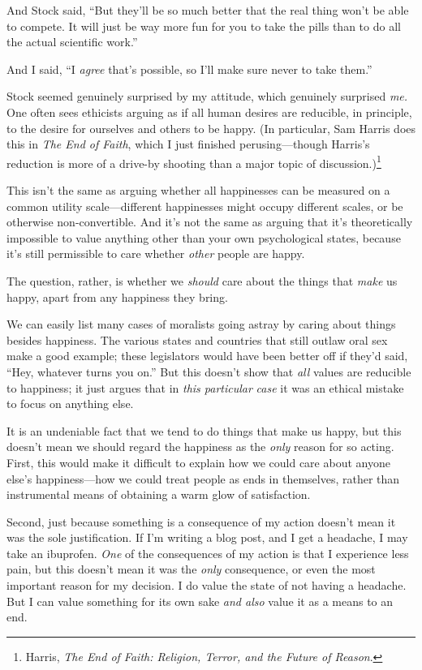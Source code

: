 {
 And Stock said, ``But they'll be
so much better that the real thing won't be able to
compete. It will just be way more fun for you to take the pills than to
do all the actual scientific work.''}

{
 And I said, ``I \textit{agree}
that's possible, so I'll make sure
never to take them.''}

{
 Stock seemed genuinely surprised by my attitude, which genuinely
surprised \textit{me.} One often sees ethicists arguing as if all human
desires are reducible, in principle, to the desire for ourselves and
others to be happy. (In particular, Sam Harris does this in \textit{The
End of Faith}, which I just finished perusing---though
Harris's reduction is more of a drive-by shooting than
a major topic of discussion.)\footnote{Harris, \textit{The End of Faith: Religion, Terror, and the
Future of Reason}.}}

{
 This isn't the same as arguing whether all
happinesses can be measured on a common utility scale---different
happinesses might occupy different scales, or be otherwise
non-convertible. And it's not the same as arguing that
it's theoretically impossible to value anything other
than your own psychological states, because it's still
permissible to care whether \textit{other} people are happy.}

{
 The question, rather, is whether we \textit{should} care about the
things that \textit{make} us happy, apart from any happiness they
bring.}

{
 We can easily list many cases of moralists going astray by caring
about things besides happiness. The various states and countries that
still outlaw oral sex make a good example; these legislators would have
been better off if they'd said, ``Hey,
whatever turns you on.'' But this
doesn't show that \textit{all} values are reducible to
happiness; it just argues that in \textit{this particular}
\textit{case} it was an ethical mistake to focus on anything else.}

{
 It is an undeniable fact that we tend to do things that make us
happy, but this doesn't mean we should regard the
happiness as the \textit{only} reason for so acting. First, this would
make it difficult to explain how we could care about anyone
else's happiness---how we could treat people as ends in
themselves, rather than instrumental means of obtaining a warm glow of
satisfaction.}

{
 Second, just because something is a consequence of my action
doesn't mean it was the sole justification. If
I'm writing a blog post, and I get a headache, I may
take an ibuprofen. \textit{One} of the consequences of my action is
that I experience less pain, but this doesn't mean it
was the \textit{only} consequence, or even the most important reason
for my decision. I do value the state of not having a headache. But I
can value something for its own sake \textit{and also} value it as a
means to an end.}

